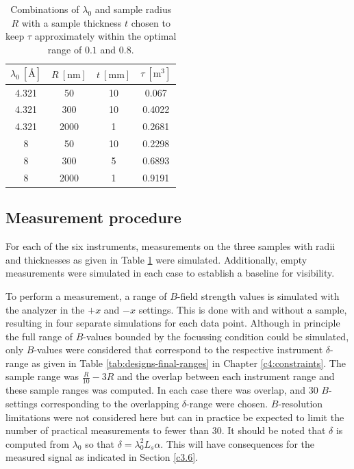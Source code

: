 \begin{table}[h!]
	\centering
	\begin{tabular}{cc|cc}
		\toprule
		$\lambda_0~[\unit{\angstrom}]$  & $R ~[\unit{\nano\meter}]$  & $t ~[\unit{\milli\meter}]$& $\tau~[\unit{\meter^3}]$ \\
		\midrule
		\num{4.321} & \num{50} & \num{10} & \num{0.067}\\
		\num{4.321} & \num{300} & \num{10} & \num{0.4022} \\
		\num{4.321} & \num{2000} & \num{1} & \num{0.2681} \\
		\num{8} & \num{50} & \num{10} & \num{0.2298} \\
		\num{8} & \num{300} & \num{5} & \num{0.6893} \\
		\num{8} & \num{2000} & \num{1} & \num{0.9191} \\
		\bottomrule
	\end{tabular}
	\caption{Combinations of $\lambda_0$ and sample radius $R$ with a sample thickness $t$ chosen to keep $\tau$ approximately within the optimal range of $0.1$ and $0.8$.}
	\label{tab:sample-thickness}
\end{table}

\subsection{Measurement procedure}
For each of the six instruments, measurements on the three samples with radii and thicknesses as given in Table \ref{tab:sample-thickness} were simulated. Additionally, empty measurements were simulated in each case to establish a baseline for visibility. 

To perform a measurement, a range of $B$-field strength values is simulated with the analyzer in the $+x$ and $-x$ settings. This is done with and without a sample, resulting in four separate simulations for each data point. Although in principle the full range of $B$-values bounded by the focussing condition could be simulated, only $B$-values were considered that correspond to the respective instrument $\delta$-range as given in Table \ref{tab:designs-final-ranges} in Chapter \ref{c4:constraints}. The sample range was $\frac{R}{10} - 3R$ and the overlap between each instrument range and these sample ranges was computed. In each case there was overlap, and 30 $B$-settings corresponding to the overlapping $\delta$-range were chosen. $B$-resolution limitations were not considered here but can in practice be expected to limit the number of practical measurements to fewer than 30. It should be noted that $\delta$ is computed from $\lambda_0$ so that $\delta = \lambda_0^2L_s\alpha$. This will have consequences for the measured signal as indicated in Section \ref{c3.6}.

